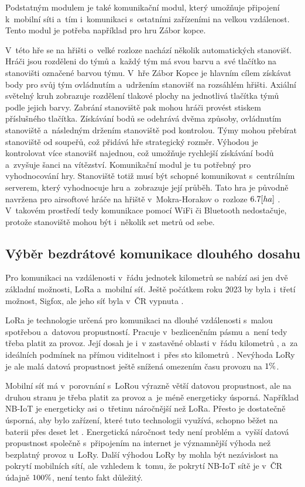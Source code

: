 Podstatným modulem je také komunikační modul, který umožňuje připojení k~mobilní síti a~tím i~komunikaci s~ostatními zařízeními na velkou vzdálenost.
Tento modul je potřeba například pro hru Zábor kopce.

V~této hře se na hřišti o~velké rozloze nachází několik automatických stanovišť.
Hráči jsou rozděleni do týmů a~každý tým má svou barvu a~své tlačítko na stanovišti označené barvou týmu.
V~hře Zábor Kopce je hlavním cílem získávat body pro svůj tým ovládnutím a~udržením stanovišť na rozsáhlém hřišti. 
Axiální světelný kruh zobrazuje rozdělení tlakové plochy na jednotlivá tlačítka týmů podle jejich barvy.
Zabrání stanoviště pak mohou hráči provést stiskem příslušného tlačítka. 
Získávání bodů se odehrává dvěma způsoby, ovládnutím stanoviště a~následným držením stanoviště pod kontrolou. 
Týmy mohou přebírat stanoviště od soupeřů, což přidává hře strategický rozměr. 
Výhodou je kontrolovat více stanovišť najednou, což umožňuje rychlejší získávání bodů a~zvyšuje šanci na vítězství.
Komunikační modul je tu potřebný pro vyhodnocování hry.
Stanoviště totiž musí být schopné komunikovat s~centrálním serverem, který vyhodnocuje hru a~zobrazuje její průběh.
Tato hra je původně navržena pro airsoftové hráče na hřiště v~Mokra-Horakov o~rozloze \(6.7\-[ha]\) \cite{MokraHorakov}.
V~takovém prostředí tedy komunikace pomocí WiFi či Bluetooth nedostačuje, protože stanoviště mohou být i~několik set metrů od sebe.

\subsection{Výběr bezdrátové komunikace dlouhého dosahu}
Pro komunikaci na vzdálenosti v~řádu jednotek kilometrů se nabízí asi jen dvě základní možnosti, LoRa a~mobilní síť.
Ještě počátkem roku 2023 by byla i~třetí možnost, Sigfox, ale jeho síť byla v~ČR vypnuta \cite{SigfoxKonci}.

LoRa je technologie určená pro komunikaci na dlouhé vzdálenosti s~malou spotřebou a~datovou propustností.
Pracuje v~bezlicenčním pásmu a~není tedy třeba platit za provoz.
Její dosah je i~v zastavěné oblasti v~řádu kilometrů \cite{LoRaSEMTECH}, a~za ideálních podmínek na přímou viditelnost i~přes sto kilometrů \cite{LoRaEMAN}. 
Nevýhoda LoRy je ale malá datová propustnost ještě snížená omezením času provozu na \(1\-\%\)\cite{LoRaEMAN}.

Mobilní síť má v~porovnání s~LoRou výrazně větší datovou propustnost, ale na druhou stranu je třeba platit za provoz a~je méně energeticky úsporná.
Například NB-IoT je energeticky asi o~třetinu náročnější než LoRa.
Přesto je dostatečně úsporná, aby bylo zařízení, které tuto technologii využívá, schopno běžet na baterii přes deset let \cite{LoRaVSNB-IoT}.
Energetická náročnost tedy není problém a~vyšší datová propustnost společně s~připojením na internet je významnější výhoda než bezplatný provoz u~LoRy.
Další výhodou LoRy by mohla být nezávislost na pokrytí mobilních sítí, ale vzhledem k~tomu, že pokrytí NB-IoT sítě je v~ČR údajně \(100\-\%\)\cite{NB-IoTPokryti}, není tento fakt důležitý. 
